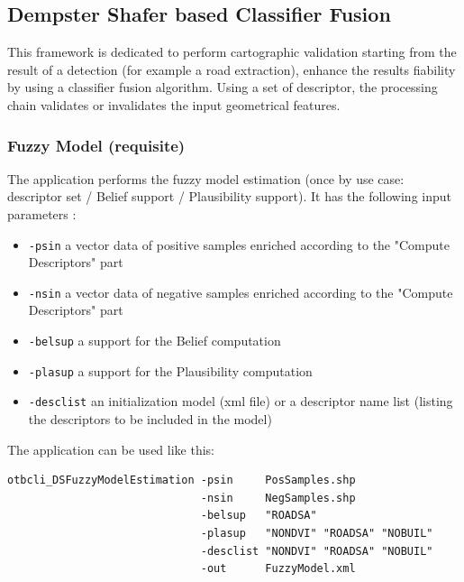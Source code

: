 \subsection{Dempster Shafer based Classifier Fusion}\label{ssec:classifierfusion}

This framework is dedicated to perform cartographic validation starting
from the result of a detection (for example a road extraction), enhance
the results fiability by using a classifier fusion algorithm. Using a
set of descriptor, the processing chain validates or invalidates the
input geometrical features.

%

\subsubsection{Fuzzy Model (requisite)}

The  application performs the fuzzy
model estimation (once by use case: descriptor set / Belief support /
Plausibility support). It has the following input parameters :
\begin{itemize}
\item \verb?-psin? a vector data of positive samples enriched according to the
"Compute Descriptors" part
\item \verb?-nsin? a vector data of negative samples enriched according to the
"Compute Descriptors" part
\item \verb?-belsup? a support for the Belief computation
\item \verb?-plasup? a support for the Plausibility computation
\item \verb?-desclist? an initialization model (xml file) or a descriptor name list
(listing the descriptors to be included in the model)
\end{itemize}

The application can be used like this:
\begin{verbatim}
otbcli_DSFuzzyModelEstimation -psin     PosSamples.shp
                              -nsin     NegSamples.shp
                              -belsup   "ROADSA"
                              -plasup   "NONDVI" "ROADSA" "NOBUIL"
                              -desclist "NONDVI" "ROADSA" "NOBUIL"
                              -out      FuzzyModel.xml
\end{verbatim}

